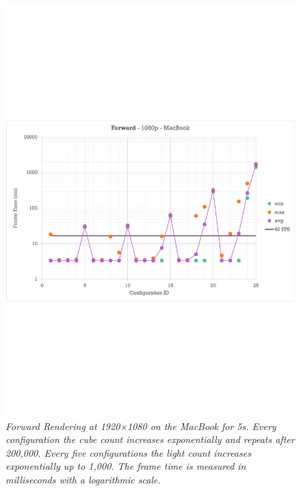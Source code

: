\documentclass[11pt]{article}
\begin{document}
\begin{figure}[h!]
  \begin{center}
    \includegraphics[width=1\columnwidth]{../forward-1080p-mac.pdf}
  \end{center}
  \caption[Forward 1080p]{
    \emph{
      Forward Rendering at 1920×1080 on the MacBook for 5s.
      Every configuration the cube count increases exponentially and repeats after 200,000.
      Every five configurations the light count increases exponentially up to 1,000.
      The frame time is measured in milliseconds with a logarithmic scale.
    }
  }\label{fig:forward-1080p-mac}
\end{figure}
\end{document}
